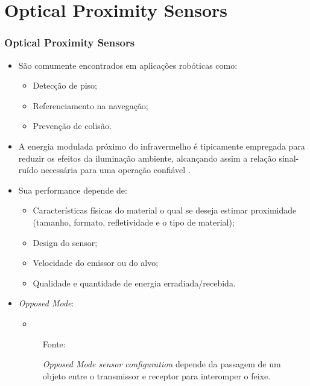 \documentclass[xcolor=dvipsnames, aspectratio=169]{beamer}
\begin{document}
\section[Optical Proximity Sensors]{Optical Proximity Sensors} 
\begin{frame}
\frametitle{Optical Proximity Sensors}
	\begin{itemize}
		\item São comumente encontrados em aplicações robóticas como:
		\begin{itemize}
			\item Detecção de piso;
			\item Referenciamento na navegação;
			\item Prevenção de colisão.
		\end{itemize}
		\item A energia modulada próximo do infravermelho é tipicamente empregada para reduzir os efeitos da iluminação ambiente, alcançando assim a relação sinal-ruído necessária para uma operação confiável \cite{everett1995sensors}.
		\item Sua performance depende de:
		\begin{itemize}
			\item Características físicas do material o qual se deseja estimar proximidade (tamanho, formato, refletividade e o tipo de material);
			\item Design do sensor;
			\item Velocidade do emissor ou do alvo;
			\item Qualidade e quantidade de energia erradiada/recebida.
		\end{itemize}
		
		\newpage
		\item \textit{Opposed Mode}:
		\begin{itemize}
			\item 
		\end{itemize}
		\begin{figure}
			\centering
			{Fonte: \cite{everett1995sensors}}
			\caption{\textit{Opposed Mode sensor configuration} depende da passagem de um objeto entre o transmissor e receptor para interomper o feixe.}
			\label{fig:8_optical_sensor_opposed_mode}
		\end{figure}


\end{itemize}
\end{frame}
\end{document}
